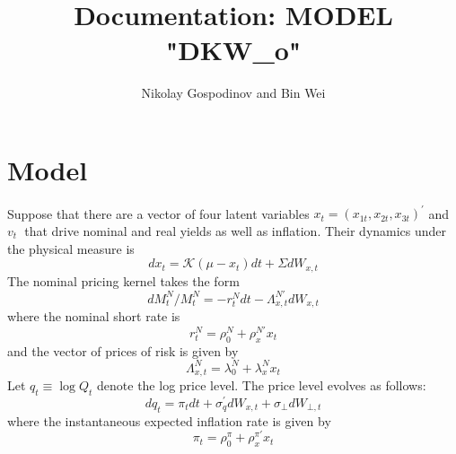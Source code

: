 \documentclass{article}
\begin{document}
\title{Documentation: MODEL "DKW\_o"}
\author{Nikolay Gospodinov and Bin Wei}
\maketitle

\section{Model}

Suppose that there are a vector of four latent variables $x_{t}=\left(
x_{1t},x_{2t},x_{3t}\right) ^{\prime }$ and $v_{t}$\textbf{\ }that drive
nominal and real yields as well as inflation. Their dynamics under the
physical measure is%
\begin{equation}
dx_{t}=\mathcal{K}\left( \mu -x_{t}\right) dt+\Sigma dW_{x,t}
\end{equation}%
The nominal pricing kernel takes the form%
\begin{equation}
dM_{t}^{N}/M_{t}^{N}=-r_{t}^{N}dt-\Lambda _{x,t}^{N\prime }dW_{x,t}
\end{equation}%
where the nominal short rate is%
\begin{equation}
r_{t}^{N}=\rho _{0}^{N}+\rho _{x}^{N\prime }x_{t}
\end{equation}%
and the vector of prices of risk is given by\qquad 
\begin{equation*}
\Lambda _{x,t}^{N}=\lambda _{0}^{N}+\lambda _{x}^{N}x_{t}
\end{equation*}%
Let $q_{t}\equiv \log Q_{t}$ denote the log price level. The price level
evolves as follows: 
\begin{equation}
dq_{t}=\pi _{t}dt+\sigma _{q}^{\prime }dW_{x,t}+\sigma _{\bot }dW_{\bot ,t}
\end{equation}%
where the instantaneous expected inflation rate is given by 
\begin{equation}
\pi _{t}=\rho _{0}^{\pi }+\rho _{x}^{\pi \prime }x_{t}
\end{equation}
\end{document}
